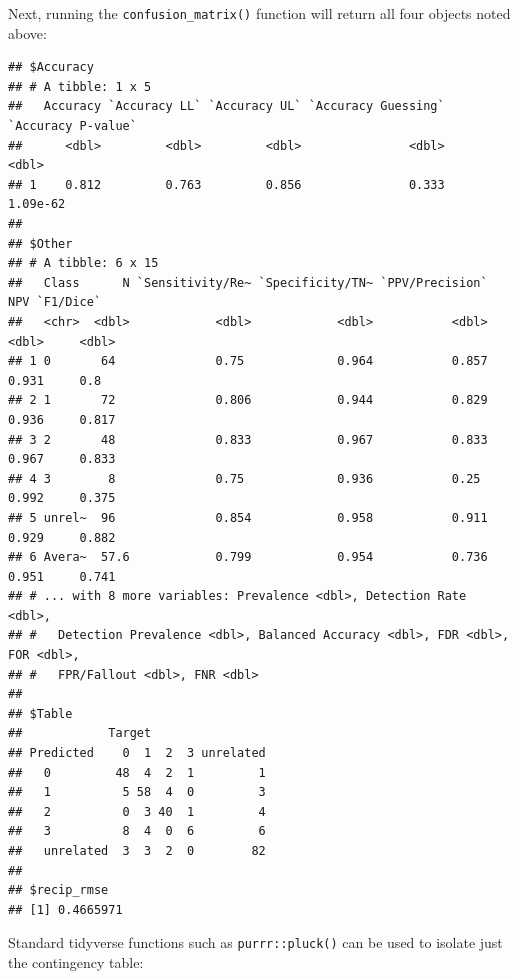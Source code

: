 \documentclass[9pt,a4paper,]{extarticle}
\newenvironment{Shaded}{\begin{snugshade}}{\end{snugshade}}
\newcommand{\DataTypeTok}[1]{\textcolor[rgb]{0.13,0.29,0.53}{#1}}
\newcommand{\KeywordTok}[1]{\textcolor[rgb]{0.13,0.29,0.53}{\textbf{#1}}}
\newcommand{\NormalTok}[1]{#1}
\newcommand{\OperatorTok}[1]{\textcolor[rgb]{0.81,0.36,0.00}{\textbf{#1}}}
\newcommand{\StringTok}[1]{\textcolor[rgb]{0.31,0.60,0.02}{#1}}
\begin{document}
Next, running the \texttt{confusion\_matrix()} function will return all four objects noted above:

\begin{Shaded}
\end{Shaded}

\begin{verbatim}
## $Accuracy
## # A tibble: 1 x 5
##   Accuracy `Accuracy LL` `Accuracy UL` `Accuracy Guessing` `Accuracy P-value`
##      <dbl>         <dbl>         <dbl>               <dbl>              <dbl>
## 1    0.812         0.763         0.856               0.333           1.09e-62
## 
## $Other
## # A tibble: 6 x 15
##   Class      N `Sensitivity/Re~ `Specificity/TN~ `PPV/Precision`   NPV `F1/Dice`
##   <chr>  <dbl>            <dbl>            <dbl>           <dbl> <dbl>     <dbl>
## 1 0       64              0.75             0.964           0.857 0.931     0.8  
## 2 1       72              0.806            0.944           0.829 0.936     0.817
## 3 2       48              0.833            0.967           0.833 0.967     0.833
## 4 3        8              0.75             0.936           0.25  0.992     0.375
## 5 unrel~  96              0.854            0.958           0.911 0.929     0.882
## 6 Avera~  57.6            0.799            0.954           0.736 0.951     0.741
## # ... with 8 more variables: Prevalence <dbl>, Detection Rate <dbl>,
## #   Detection Prevalence <dbl>, Balanced Accuracy <dbl>, FDR <dbl>, FOR <dbl>,
## #   FPR/Fallout <dbl>, FNR <dbl>
## 
## $Table
##            Target
## Predicted    0  1  2  3 unrelated
##   0         48  4  2  1         1
##   1          5 58  4  0         3
##   2          0  3 40  1         4
##   3          8  4  0  6         6
##   unrelated  3  3  2  0        82
## 
## $recip_rmse
## [1] 0.4665971
\end{verbatim}

Standard tidyverse functions such as \texttt{purrr::pluck()} can be used to isolate just the contingency table:

\begin{Shaded}
\end{Shaded}
\end{document}
